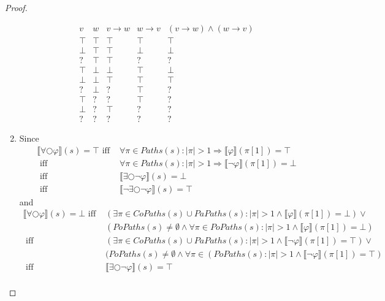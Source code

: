 \documentclass[12pt]{article}
\newcommand{\nxt}{\bigcirc}
\theoremstyle{definition}
\newcommand{\satisfaction}[1]{\llbracket #1 \rrbracket}
\newcommand{\bottom}{\mathord{\perp}}
\begin{document}
\begin{proof}
\begin{enumerate}
\[
\begin{array}{ll|ll|l}
v     & w     & v \rightarrow w & w \rightarrow v & (v \rightarrow w) \wedge (w \rightarrow v)\\\hline
\top  & \top  & \top  & \top  & \top\\
\bottom & \top  & \top  & \bottom & \bottom\\
?     & \top  & \top  & ?     & ?\\
\top  & \bottom & \bottom & \top  & \bottom\\
\bottom & \bottom & \top  & \top  & \top\\
?     & \bottom & ?     & \top  & ?\\
\top  & ?     & ?     & \top  & ?\\
\bottom & ?     & \top  & ?     & ?\\
?     & ?     & ?     & ?     & ?
\end{array}
\]
\item
Since
\begin{align*}
\satisfaction{\forall \nxt \varphi}(s) = \top
\mbox{ iff } & \forall \pi \in \mathit{Paths}(s) : |\pi| > 1 \Rightarrow \satisfaction{\varphi}(\pi[1]) = \top\\
\mbox{ iff } & \forall \pi \in \mathit{Paths}(s) : |\pi| > 1 \Rightarrow \satisfaction{\neg \varphi}(\pi[1]) = \bottom\\
\mbox{ iff } & \satisfaction{\exists \nxt \neg \varphi}(s) = \bottom\\
\mbox{ iff } & \satisfaction{\neg \exists \nxt \neg \varphi}(s) = \top
\end{align*}
and
\begin{align*}
\satisfaction{\forall \nxt \varphi}(s) = \bottom
\mbox{ iff } & (\exists \pi \in \mathit{CoPaths}(s) \cup \mathit{PaPaths}(s) : |\pi| > 1 \wedge \satisfaction{\varphi}(\pi[1]) = \bottom) \vee\\
& (\mathit{PoPaths}(s) \not= \emptyset \wedge \forall \pi \in \mathit{PoPaths}(s) : |\pi| > 1 \wedge \satisfaction{\varphi}(\pi[1]) = \bottom)\\
\mbox{ iff } & (\exists \pi \in \mathit{CoPaths}(s) \cup \mathit{PaPaths}(s) : |\pi| > 1 \wedge \satisfaction{\neg \varphi}(\pi[1]) = \top) \vee\\
& (\mathit{PoPaths}(s) \not= \emptyset \wedge \forall \pi \in (\mathit{PoPaths}(s) : |\pi| > 1 \wedge \satisfaction{\neg \varphi}(\pi[1]) = \top)\\
\mbox{ iff } & \satisfaction{\exists \nxt \neg \varphi}(s) = \top\\

\end{align*}
\end{enumerate}
\end{proof}
\end{document}
